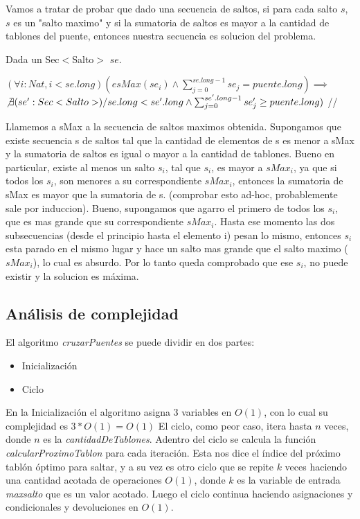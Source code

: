 Vamos a tratar de probar que dado una secuencia de saltos, si para cada salto $s$, $s$ es un "salto maximo" y si la sumatoria de saltos es mayor a la cantidad de tablones del puente, entonces nuestra secuencia es solucion del problema.

Dada un Sec$<$Salto$>$ $se$.

$(\forall i:Nat, i < se.long)(esMax(se_{i}) \wedge \sum_{j=0}^{se.long-1}se_{j} = puente.long)\implies$ \\ $\not\exists (se':Sec<Salto>) /
se.long < se'.long \wedge \sum_{j=0}^{se'.long-1}se'_{j} \geq puente.long)$  //

Llamemos a sMax a la secuencia de saltos maximos obtenida.
Supongamos que existe secuencia s de saltos tal que la cantidad de elementos de s es menor a sMax y la sumatoria de saltos es igual o mayor a la cantidad de tablones.
Bueno en particular, existe al menos un salto $s_{i}$, tal que $s_{i}$, es mayor a $sMax_{i}$,  ya que si todos los $s_{i}$, son menores a su correspondiente $sMax_{i}$,
entonces la sumatoria de sMax es mayor que la sumatoria de s. (comprobar esto ad-hoc, probablemente sale por induccion).
Bueno, supongamos que agarro el primero de todos los $s_{i}$, que es mas grande que su correspondiente $sMax_{i}$.
Hasta ese momento las dos subsecuencias (desde el principio hasta el elemento i) pesan lo mismo, entonces $s_{i}$ esta parado en el mismo lugar y hace un salto mas grande que el salto maximo ($sMax_{i}$), lo cual es absurdo.
Por lo tanto queda comprobado que ese $s_{i}$, no puede existir y la solucion es m\'axima.

\subsection{An\'alisis de complejidad}
El algoritmo \textit{cruzarPuentes} se puede dividir en dos partes:
\begin{itemize}
\item Inicialización
\item Ciclo
\end{itemize}

En la Inicialización el algoritmo asigna 3 variables en $O(1)$, con lo cual su complejidad es $3*O(1) = O(1)$
El ciclo, como peor caso, itera hasta $n$ veces, donde $n$ es la \textit{cantidadDeTablones}. Adentro del ciclo se calcula la función \textit{calcularProximoTablon} para cada iteración. Esta nos dice el índice del próximo tablón óptimo para saltar, y a su vez es otro ciclo que se repite $k$ veces haciendo una cantidad acotada de operaciones $O(1)$, donde $k$ es la variable de entrada \textit{maxsalto} que es un valor acotado.
Luego el ciclo continua haciendo asignaciones y condicionales y devoluciones en $O(1)$.

